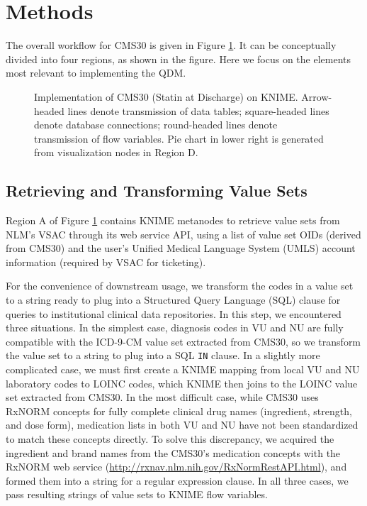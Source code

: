 \documentclass{article}
\begin{document}
\section{Methods}

The overall workflow for CMS30 is given in Figure \ref{fig:knime-snapshot-1}. It can be conceptually divided into four regions, as shown in the figure. Here we focus on the elements most relevant to implementing the QDM.

\begin{figure}
\centering
	\caption{Implementation of CMS30 (Statin at Discharge) on KNIME. Arrow-headed lines denote transmission of data tables; square-headed lines denote database connections; round-headed lines denote transmission of flow variables. Pie chart in lower right is generated from visualization nodes in Region D.
	}\label{fig:knime-snapshot-1}
\end{figure}

\subsection{Retrieving and Transforming Value Sets}

Region A of Figure \ref{fig:knime-snapshot-1} contains KNIME metanodes to retrieve value sets from NLM's VSAC through its web service API, using a list of value set OIDs (derived from CMS30) and the user's Unified Medical Language System (UMLS) account information (required by VSAC for ticketing).

For the convenience of downstream usage, we transform the codes in a value set to a string ready to plug into a Structured Query Language (SQL) clause for queries to institutional clinical data repositories. In this step, we encountered three situations. In the simplest case, diagnosis codes in VU and NU are fully compatible with the ICD-9-CM value set extracted from CMS30, so we transform the value set to a string to plug into a SQL \texttt{IN} clause. In a slightly more complicated case, we must first create a KNIME mapping from local VU and NU laboratory codes to LOINC codes, which KNIME then joins to the LOINC value set extracted from CMS30. In the most difficult case, while CMS30 uses RxNORM concepts for fully complete clinical drug names (ingredient, strength, and dose form), medication lists in both VU and NU have not been standardized to match these concepts directly. To solve this discrepancy, we acquired the ingredient and brand names from the CMS30's medication concepts with the RxNORM web service (\url{http://rxnav.nlm.nih.gov/RxNormRestAPI.html}), and formed them into a string for a regular expression clause. In all three cases, we pass resulting strings of value sets to KNIME flow variables.
\end{document}

